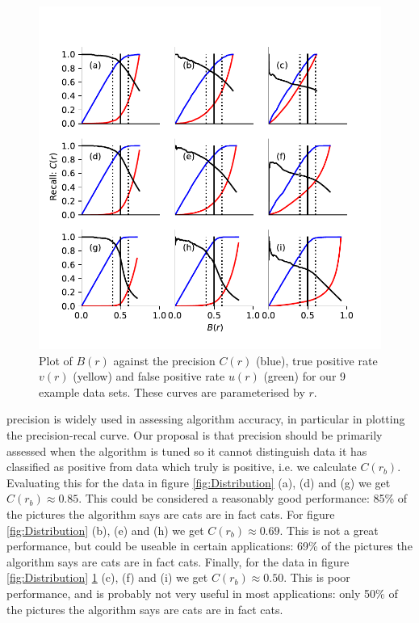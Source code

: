 \documentclass{article}
\begin{document}
\begin{figure}[t]
\centering
\includegraphics[scale=1]{Balance.pdf}
\caption{Plot of $B(r)$ against the precision $C(r)$ (blue), true positive rate $v(r)$ (yellow) and false positive rate $u(r)$ (green) for our 9 example data sets. These curves are parameterised by $r$. }
\label{fig:balance}
\end{figure}

precision is widely used in assessing algorithm accuracy, in particular in plotting the precision-recal curve. Our proposal is that precision should be primarily assessed when the algorithm is tuned so it cannot distinguish data it has classified as positive from data which truly is positive, i.e. we calculate $C(r_b)$. Evaluating this for the data in figure \ref{fig:Distribution} (a), (d) and (g) we get $C(r_b) \approx  0.85$. This could be considered a reasonably good performance: 85\% of the pictures the algorithm says are cats are in fact cats. For figure \ref{fig:Distribution}  (b), (e) and (h) we get $C(r_b) \approx 0.69$. This is not a great performance, but could be useable in certain applications: 69\% of the pictures the algorithm says are cats are in fact cats. Finally, for the data in figure \ref{fig:Distribution} \ref{fig:balance} (c), (f) and (i) we get $C(r_b) \approx  0.50$. This is poor performance, and is probably not very useful in most applications: only 50\% of the pictures the algorithm says are cats are in fact cats. 
\end{document}
